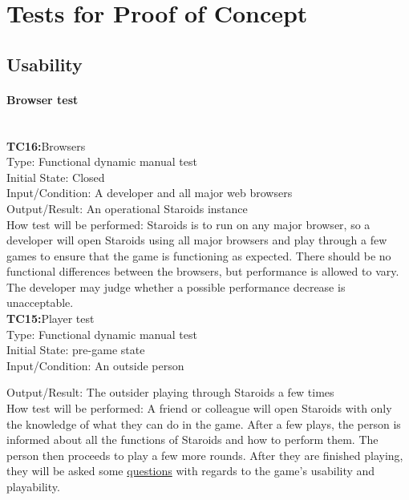 \documentclass[12pt, titlepage]{article}
\begin{document}
\section{Tests for Proof of Concept}

\subsection{Usability}

\paragraph{Browser test\\\\}

\textbf{TC16:}Browsers\\

Type: Functional dynamic manual test\\

Initial State: Closed\\

Input/Condition: A developer and all major web browsers\\

Output/Result: An operational Staroids instance\\

How test will be performed: Staroids is to run on any major browser, so a developer will open Staroids using all major browsers and play through a few games to ensure that the game is functioning as expected. There should be no functional differences between the browsers, but performance is allowed to vary. The developer may judge whether a possible performance decrease is unacceptable.\\

\textbf{TC15:}Player test\\

Type: Functional dynamic manual test\\

Initial State: pre-game state\\

Input/Condition: An outside person

Output/Result: The outsider playing through Staroids a few times\\

How test will be performed: A friend or colleague will open Staroids with only the knowledge of what they can do in the game. After a few plays, the person is informed about all the functions of Staroids and how to perform them. The person then proceeds to play a few more rounds. After they are finished playing, they will be asked some \hyperref[interview:questions]{questions} with regards to the game's usability and playability.\\
\end{document}
